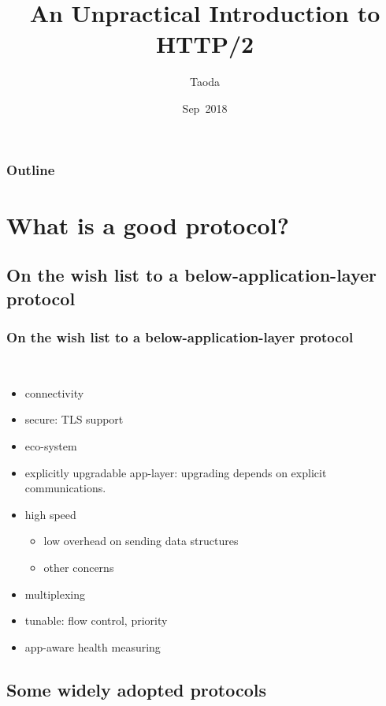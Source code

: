 \documentclass[lualatex]{beamer}
\title[HTTP/2]{An Unpractical Introduction to HTTP/2}
\author{Taoda}
\institute{YITU tech}
\date{Sep\ 2018}
\begin{document}
\begin{frame}
\titlepage
\end{frame}

\begin{frame}
  \frametitle{Outline}
  \tableofcontents
\end{frame}

\section{What is a good protocol?}
\subsection{On the wish list to a below-application-layer protocol}

\begin{frame}
  \frametitle{On the wish list to a below-application-layer protocol}

  \begin{block}{~}
    \begin{itemize}
    \item connectivity
    \item secure: TLS support
    \item eco-system
    \item explicitly upgradable app-layer: upgrading depends on explicit communications.
    \item high speed
      \begin{itemize}
      \item low overhead on sending data structures
      \item other concerns
      \end{itemize}
    \item multiplexing
    \item tunable: flow control, priority
    \item app-aware health measuring
    \end{itemize}
  \end{block}
\end{frame}

\subsection{Some widely adopted protocols}
\end{document}
